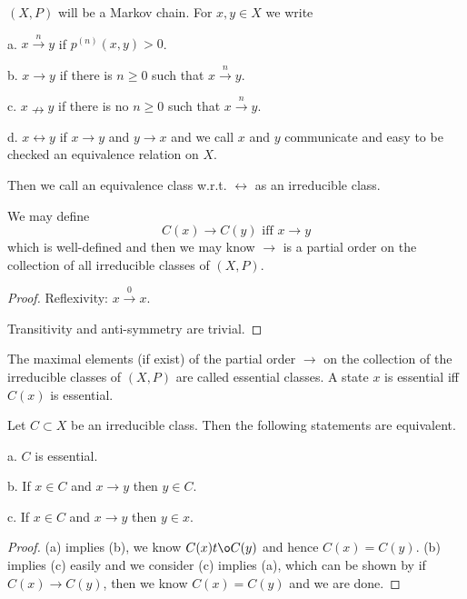 \documentclass[lang=en, color=blue, ]{elegantbook}
\begin{document}
\begin{definition}
    $(X,P)$ will be a Markov chain. For $x,y \in X$ we write\par
    a. $x\overset{n}{\rightarrow} y$ if $p^{(n)}(x,y)>0$.\par
    b. $x\to y$ if there is $n\geq 0$ such that $x\overset{n}{\rightarrow} y$.\par
    c. $x\nrightarrow y$ if there is no $n\geq 0$ such that  $x\overset{n}{\rightarrow} y$.\par
    d. $x \leftrightarrow y$ if $x\to y$ and $y\to x$ and we call $x$ and $y$ communicate and easy to be checked an equivalence relation on $X$.\par
    Then we call an equivalence class w.r.t. $\leftrightarrow$ as an irreducible class.
\end{definition}

\begin{lemma}
    We may define
    \[C(x)\to C(y)\text{ iff }x\to y\]
    which is well-defined and then we may know $\to$ is a partial order on the collection of all irreducible classes of $(X,P)$.
\end{lemma}
\begin{proof}
    Reflexivity: $x\overset{0}{\rightarrow} x$.\par
    Transitivity and anti-symmetry are trivial.
\end{proof}

\begin{definition}
    The maximal elements (if exist) of the partial order $\to$ on the collection of the irreducible classes of $(X,P)$ are called essential classes. A state $x$ is essential iff $C(x)$ is essential.
\end{definition}

\begin{proposition}
    Let $C\subset X$ be an irreducible class. Then the following statements are equivalent.\par
    a. $C$ is essential.\par
    b. If $x\in C$ and $x\to y$ then $y\in C$.\par
    c. If $x\in C$ and $x\to y$ then $y\in x$. 
\end{proposition}
\begin{proof}
    (a) implies (b), we know $C(x) t\o C(y)$ and hence $C(x) = C(y)$. (b) implies (c) easily and we consider (c) implies (a), which can be shown by if $C(x) \to C(y)$, then we know $C(x) = C(y)$ and we are done.
\end{proof}
\end{document}
